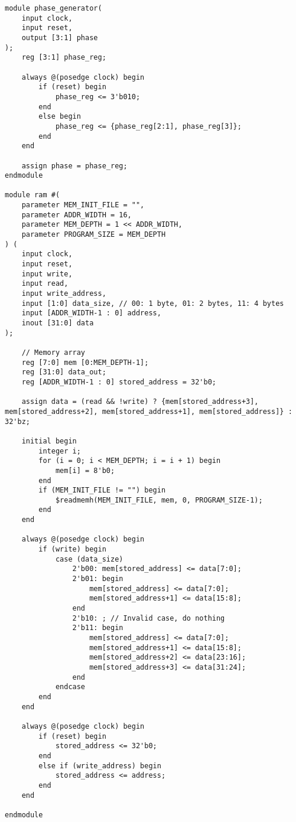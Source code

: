 \begin{lstlisting}
module phase_generator(
    input clock,
    input reset,
    output [3:1] phase
);
    reg [3:1] phase_reg;

    always @(posedge clock) begin
        if (reset) begin
            phase_reg <= 3'b010;
        end
        else begin
            phase_reg <= {phase_reg[2:1], phase_reg[3]};
        end
    end

    assign phase = phase_reg;
endmodule

module ram #(
    parameter MEM_INIT_FILE = "",
    parameter ADDR_WIDTH = 16,
    parameter MEM_DEPTH = 1 << ADDR_WIDTH,
    parameter PROGRAM_SIZE = MEM_DEPTH
) (
    input clock,
    input reset,
    input write,
    input read,
    input write_address, 
    input [1:0] data_size, // 00: 1 byte, 01: 2 bytes, 11: 4 bytes
    input [ADDR_WIDTH-1 : 0] address,
    inout [31:0] data
);

    // Memory array
    reg [7:0] mem [0:MEM_DEPTH-1];
    reg [31:0] data_out;
    reg [ADDR_WIDTH-1 : 0] stored_address = 32'b0; 

    assign data = (read && !write) ? {mem[stored_address+3], mem[stored_address+2], mem[stored_address+1], mem[stored_address]} : 32'bz;

    initial begin
        integer i;
        for (i = 0; i < MEM_DEPTH; i = i + 1) begin
            mem[i] = 8'b0;
        end
        if (MEM_INIT_FILE != "") begin
            $readmemh(MEM_INIT_FILE, mem, 0, PROGRAM_SIZE-1);
        end
    end

    always @(posedge clock) begin
        if (write) begin
            case (data_size)
                2'b00: mem[stored_address] <= data[7:0];
                2'b01: begin
                    mem[stored_address] <= data[7:0];
                    mem[stored_address+1] <= data[15:8];
                end
                2'b10: ; // Invalid case, do nothing
                2'b11: begin
                    mem[stored_address] <= data[7:0];
                    mem[stored_address+1] <= data[15:8];
                    mem[stored_address+2] <= data[23:16];
                    mem[stored_address+3] <= data[31:24];
                end
            endcase
        end
    end

    always @(posedge clock) begin
        if (reset) begin
            stored_address <= 32'b0;
        end
        else if (write_address) begin
            stored_address <= address;
        end
    end

endmodule

\end{lstlisting}

